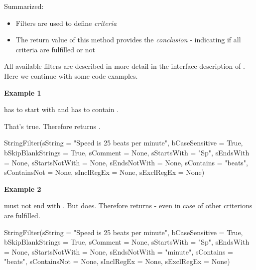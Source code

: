 \vspace{1ex}

Summarized:

\begin{itemize}
   \item Filters are used to define \textit{criteria}
   \item The return value of this method provides the \textit{conclusion} - indicating if all criteria are fulfilled or not
\end{itemize}

All available filters are described in more detail in the interface description of . Here we continue with some code examples.

\newpage

\textbf{Example 1}

 has to start with  and has to contain .

That's true. Therefore  returns .

\begin{pythoncode}
StringFilter(sString           = "Speed is 25 beats per minute",
             bCaseSensitive    = True,
             bSkipBlankStrings = True,
             sComment          = None,
             sStartsWith       = "Sp",
             sEndsWith         = None,
             sStartsNotWith    = None,
             sEndsNotWith      = None,
             sContains         = "beats",
             sContainsNot      = None,
             sInclRegEx        = None,
             sExclRegEx        = None)
\end{pythoncode}

\textbf{Example 2}

 must not end with . But does.
Therefore  returns  - even in case of other criterions are fulfilled.

\begin{pythoncode}
StringFilter(sString           = "Speed is 25 beats per minute",
             bCaseSensitive    = True,
             bSkipBlankStrings = True,
             sComment          = None,
             sStartsWith       = "Sp",
             sEndsWith         = None,
             sStartsNotWith    = None,
             sEndsNotWith      = "minute",
             sContains         = "beats",
             sContainsNot      = None,
             sInclRegEx        = None,
             sExclRegEx        = None)
\end{pythoncode}

